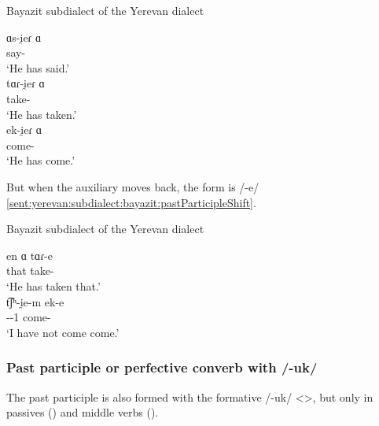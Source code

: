 \begin{exe}
	\ex Bayazit subdialect of the Yerevan dialect \label{sent:yerevan:subdialect:bayazit:pastParticiple}
	\begin{xlist}
		\ex \gll ɑs-i̯eɾ ɑ \\
		say-{\perfcvb} {\aux} \\
		\trans `He has said.' \\
		\ex \gll tɑɾ-i̯eɾ ɑ \\
		take-{\perfcvb} {\aux} \\
		\trans `He has taken.' \\
		\ex \gll ek-i̯eɾ ɑ \\
		come-{\perfcvb} {\aux} \\
		\trans `He has come.' \\
	\end{xlist}
\end{exe}


But when the auxiliary moves back, the form is /-e/ \ref{sent:yerevan:subdialect:bayazit:pastParticipleShift}.

\begin{exe}
	\ex Bayazit subdialect of the Yerevan dialect \label{sent:yerevan:subdialect:bayazit:pastParticipleShift}
	\begin{xlist} 
		\ex \gll en ɑ tɑɾ-e   \\
		that {\aux} take-{\perfcvb}\\
		\trans `He has taken that.' \\
		\armenian{էն ա տարէ}
		\ex \gll t͡ʃʰ-i̯e-m ek-e \\
		{\neggloss}-{\aux}-1{\sg} come-{\perfcvb} \\
		\trans `I have not come come.' \\
		\armenian{չեմ էկէ}
	\end{xlist}
\end{exe}

\subsubsection{Past participle or perfective converb with /-uk/} 

The past participle is also formed with the formative /-uk/ <>, but only in passives () and middle verbs (). 



